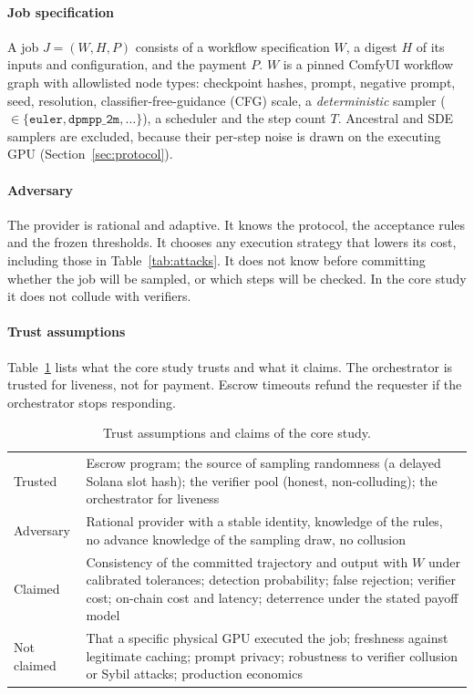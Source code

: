 \documentclass[preprint,review,12pt,authoryear]{elsarticle}
\theoremstyle{definition}
\begin{document}
\paragraph{Job specification}
A job $J=(W,H,P)$ consists of a workflow specification $W$, a digest $H$ of its inputs and configuration, and the payment $P$. $W$ is a pinned ComfyUI workflow graph with allowlisted node types: checkpoint hashes, prompt, negative prompt, seed, resolution, classifier-free-guidance (CFG) scale, a \emph{deterministic} sampler ($\in\{\texttt{euler},\texttt{dpmpp\_2m},\dots\}$), a scheduler and the step count $T$. Ancestral and SDE samplers are excluded, because their per-step noise is drawn on the executing GPU (Section~\ref{sec:protocol}).

\paragraph{Adversary}
The provider is rational and adaptive. It knows the protocol, the acceptance rules and the frozen thresholds. It chooses any execution strategy that lowers its cost, including those in Table~\ref{tab:attacks}. It does not know before committing whether the job will be sampled, or which steps will be checked. In the core study it does not collude with verifiers.

\paragraph{Trust assumptions}
Table~\ref{tab:trust} lists what the core study trusts and what it claims. The orchestrator is trusted for liveness, not for payment. Escrow timeouts refund the requester if the orchestrator stops responding.

\begin{table}[t]
\centering\small
\caption{Trust assumptions and claims of the core study.}\label{tab:trust}
\begin{tabularx}{\linewidth}{lX}
\toprule
Trusted & Escrow program; the source of sampling randomness (a delayed Solana slot hash); the verifier pool (honest, non-colluding); the orchestrator for liveness \\
Adversary & Rational provider with a stable identity, knowledge of the rules, no advance knowledge of the sampling draw, no collusion \\
Claimed & Consistency of the committed trajectory and output with $W$ under calibrated tolerances; detection probability; false rejection; verifier cost; on-chain cost and latency; deterrence under the stated payoff model \\
Not claimed & That a specific physical GPU executed the job; freshness against legitimate caching; prompt privacy; robustness to verifier collusion or Sybil attacks; production economics \\
\bottomrule
\end{tabularx}
\end{table}
\end{document}

